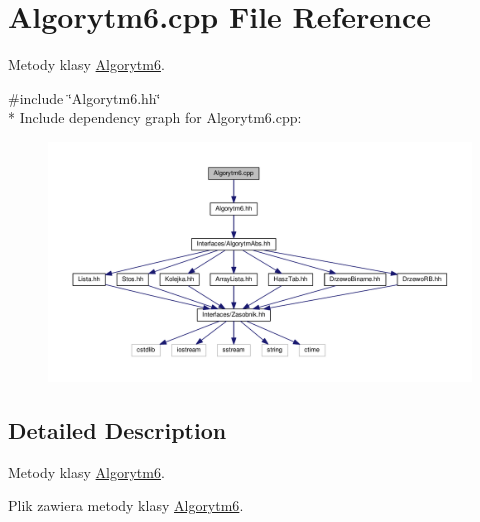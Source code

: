 \hypertarget{a00030}{}\section{Algorytm6.\+cpp File Reference}
\label{a00030}


Metody klasy \hyperlink{a00007}{Algorytm6}.  


{\ttfamily \#include \char`\"{}Algorytm6.\+hh\char`\"{}}\\*
Include dependency graph for Algorytm6.\+cpp\+:
\nopagebreak
\begin{figure}[H]
\begin{center}
\leavevmode
\includegraphics[width=350pt]{a00075}
\end{center}
\end{figure}


\subsection{Detailed Description}
Metody klasy \hyperlink{a00007}{Algorytm6}. 

Plik zawiera metody klasy \hyperlink{a00007}{Algorytm6}. 
